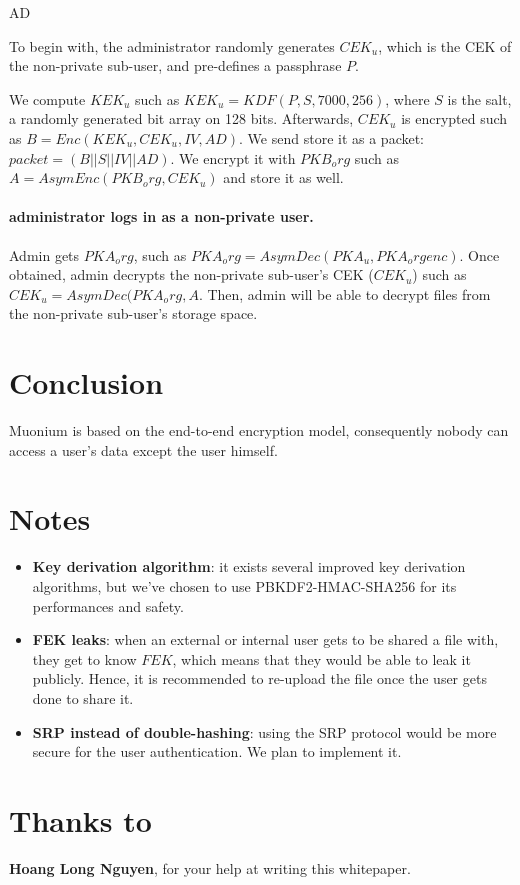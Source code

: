 AD\documentclass[a4paper,10pt]{article}
\begin{document}
To begin with, the administrator randomly generates $CEK_u$, which is the CEK of the
non-private sub-user, and pre-defines a passphrase $P$.

We compute $KEK_u$ such as $KEK_u=KDF(P, S, 7000, 256)$, where $S$ is the salt,
a randomly generated bit array on 128 bits. Afterwards, $CEK_u$ is encrypted such
as $B=Enc(KEK_u,CEK_u, IV,AD)$. We send store it as a packet:
$packet=(B||S||IV||AD)$. We encrypt it with $PKB_org$ such as
$A=AsymEnc(PKB_org, CEK_u)$ and store it as well.

\paragraph{administrator logs in as a non-private user.}

Admin gets $PKA_org$, such as $PKA_org=AsymDec(PKA_u, PKA_orgenc)$. Once obtained,
admin decrypts the non-private sub-user's CEK ($CEK_u$) such as
$CEK_u=AsymDec(PKA_org, A$. Then, admin will be able to decrypt files
from the non-private sub-user's storage space.

\section{Conclusion}
Muonium is based on the end-to-end encryption model, consequently nobody can access a user's data except the user himself.

\section{Notes}

\begin{itemize}
	\item \textbf{Key derivation algorithm}: it exists several improved key derivation
	algorithms, but we've chosen to use PBKDF2-HMAC-SHA256 for its performances and safety.
	\item \textbf{FEK leaks}: when an external or internal user gets to be shared a file with,
	they get to know $FEK$, which means that they would be able to leak it publicly. Hence,
	it is recommended to re-upload the file once the user gets done to share it.
	\item \textbf{SRP instead of double-hashing}: using the SRP protocol would be more
	secure for the user authentication. We plan to implement it.
\end{itemize}


\section{Thanks to}

\textbf{Hoang Long Nguyen}, for your help at writing this whitepaper.


\end{document}
